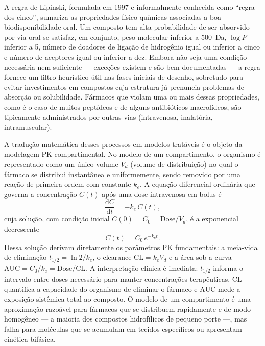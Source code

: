 A regra de Lipinski, formulada em 1997 e informalmente conhecida como ``regra dos cinco'', sumariza as propriedades físico-químicas associadas a boa biodisponibilidade oral. Um composto tem alta probabilidade de ser absorvido por via oral se satisfaz, em conjunto, peso molecular inferior a 500~Da, $\log P$ inferior a 5, número de doadores de ligação de hidrogênio igual ou inferior a cinco e número de aceptores igual ou inferior a dez. Embora não seja uma condição necessária nem suficiente --- exceções existem e são bem documentadas --- a regra fornece um filtro heurístico útil nas fases iniciais de desenho, sobretudo para evitar investimentos em compostos cuja estrutura já prenuncia problemas de absorção ou solubilidade. Fármacos que violam uma ou mais dessas propriedades, como é o caso de muitos peptídeos e de alguns antibióticos macrolídeos, são tipicamente administrados por outras vias (intravenosa, inalatória, intramuscular).

A tradução matemática desses processos em modelos tratáveis é o objeto da modelagem PK compartimental. No modelo de um compartimento, o organismo é representado como um único volume $V_d$ (volume de distribuição) no qual o fármaco se distribui instantânea e uniformemente, sendo removido por uma reação de primeira ordem com constante $k_e$. A equação diferencial ordinária que governa a concentração $C(t)$ após uma dose intravenosa em bolus é
\begin{equation*}
\frac{\mathrm{d}C}{\mathrm{d}t} = -k_e \, C(t),
\end{equation*}
cuja solução, com condição inicial $C(0) = C_0 = \mathrm{Dose}/V_d$, é a exponencial decrescente
\begin{equation*}
C(t) = C_0 \, e^{-k_e t}.
\end{equation*}
Dessa solução derivam diretamente os parâmetros PK fundamentais: a meia-vida de eliminação $t_{1/2} = \ln 2 / k_e$, o clearance $\mathrm{CL} = k_e V_d$ e a área sob a curva $\mathrm{AUC} = C_0 / k_e = \mathrm{Dose}/\mathrm{CL}$. A interpretação clínica é imediata: $t_{1/2}$ informa o intervalo entre doses necessário para manter concentrações terapêuticas, $\mathrm{CL}$ quantifica a capacidade do organismo de eliminar o fármaco e $\mathrm{AUC}$ mede a exposição sistêmica total ao composto. O modelo de um compartimento é uma aproximação razoável para fármacos que se distribuem rapidamente e de modo homogêneo --- a maioria dos compostos hidrofílicos de pequeno porte ---, mas falha para moléculas que se acumulam em tecidos específicos ou apresentam cinética bifásica.

